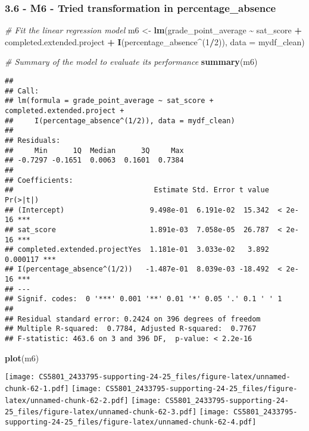 \documentclass[
]{article}
\newenvironment{Shaded}{\begin{snugshade}}{\end{snugshade}}
\newcommand{\AttributeTok}[1]{\textcolor[rgb]{0.13,0.29,0.53}{#1}}
\newcommand{\CommentTok}[1]{\textcolor[rgb]{0.56,0.35,0.01}{\textit{#1}}}
\newcommand{\DecValTok}[1]{\textcolor[rgb]{0.00,0.00,0.81}{#1}}
\newcommand{\FunctionTok}[1]{\textcolor[rgb]{0.13,0.29,0.53}{\textbf{#1}}}
\newcommand{\NormalTok}[1]{#1}
\newcommand{\OtherTok}[1]{\textcolor[rgb]{0.56,0.35,0.01}{#1}}
\newcommand{\SpecialCharTok}[1]{\textcolor[rgb]{0.81,0.36,0.00}{\textbf{#1}}}
\begin{document}
\subsubsection{3.6 - M6 - Tried transformation in
percentage\_absence}\label{m6---tried-transformation-in-percentage_absence}

\begin{Shaded}
\begin{Highlighting}[]
\CommentTok{\# Fit the linear regression model}
\NormalTok{m6 }\OtherTok{\textless{}{-}} \FunctionTok{lm}\NormalTok{(grade\_point\_average }\SpecialCharTok{\textasciitilde{}}\NormalTok{ sat\_score }\SpecialCharTok{+}\NormalTok{ completed.extended.project }\SpecialCharTok{+} \FunctionTok{I}\NormalTok{(percentage\_absence}\SpecialCharTok{\^{}}\NormalTok{(}\DecValTok{1}\SpecialCharTok{/}\DecValTok{2}\NormalTok{)), }\AttributeTok{data =}\NormalTok{ mydf\_clean)}

\CommentTok{\# Summary of the model to evaluate its performance}
\FunctionTok{summary}\NormalTok{(m6)}
\end{Highlighting}
\end{Shaded}

\begin{verbatim}
## 
## Call:
## lm(formula = grade_point_average ~ sat_score + completed.extended.project + 
##     I(percentage_absence^(1/2)), data = mydf_clean)
## 
## Residuals:
##     Min      1Q  Median      3Q     Max 
## -0.7297 -0.1651  0.0063  0.1601  0.7384 
## 
## Coefficients:
##                                 Estimate Std. Error t value Pr(>|t|)    
## (Intercept)                    9.498e-01  6.191e-02  15.342  < 2e-16 ***
## sat_score                      1.891e-03  7.058e-05  26.787  < 2e-16 ***
## completed.extended.projectYes  1.181e-01  3.033e-02   3.892 0.000117 ***
## I(percentage_absence^(1/2))   -1.487e-01  8.039e-03 -18.492  < 2e-16 ***
## ---
## Signif. codes:  0 '***' 0.001 '**' 0.01 '*' 0.05 '.' 0.1 ' ' 1
## 
## Residual standard error: 0.2424 on 396 degrees of freedom
## Multiple R-squared:  0.7784, Adjusted R-squared:  0.7767 
## F-statistic: 463.6 on 3 and 396 DF,  p-value: < 2.2e-16
\end{verbatim}

\begin{Shaded}
\begin{Highlighting}[]
\FunctionTok{plot}\NormalTok{(m6)}
\end{Highlighting}
\end{Shaded}

\texttt{[image: CS5801\_2433795-supporting-24-25\_files/figure-latex/unnamed-chunk-62-1.pdf]}
\texttt{[image: CS5801\_2433795-supporting-24-25\_files/figure-latex/unnamed-chunk-62-2.pdf]}
\texttt{[image: CS5801\_2433795-supporting-24-25\_files/figure-latex/unnamed-chunk-62-3.pdf]}
\texttt{[image: CS5801\_2433795-supporting-24-25\_files/figure-latex/unnamed-chunk-62-4.pdf]}
\end{document}

